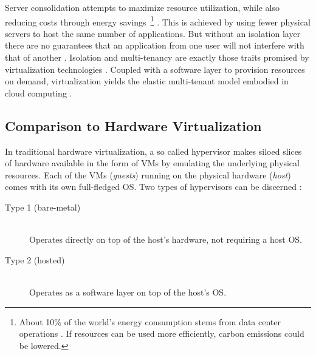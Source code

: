 Server consolidation attempts to maximize resource utilization, while also reducing costs through energy savings~\footnote{About 10\% of the world's energy consumption stems from data center operations \cite[p.~1]{scheepers2014virtualization}. If resources can be used more efficiently, carbon emissions could be lowered.} \cite[p.~233]{xavier2013performance} \cite[p.~2]{eder2016hypervisor}. This is achieved by using fewer physical servers to host the same number of applications. But without an isolation layer there are no guarantees that an application from one user will not interfere with that of another \cite[p.~233]{xavier2013performance}. Isolation and multi-tenancy are exactly those traits promised by virtualization technologies \cite[p.~21]{da2018containers}. Coupled with a software layer to provision resources on demand, virtualization yields the elastic multi-tenant model embodied in \gls{cloud computing} \cite[p.~203]{kang2016container} \cite[p.~81]{bernstein2014containers} \cite[p.~24]{pahl2015containerization}.


\subsection{Comparison to Hardware Virtualization}
\label{sec:os-hardware-virtualization-comparison}

In traditional hardware virtualization, a so called hypervisor makes siloed slices of hardware available in the form of \acp{VM} by emulating the underlying physical resources. Each of the \acp{VM} (\textit{guests}) running on the physical hardware (\textit{host}) comes with its own full-fledged \acs{OS}. Two types of hypervisors can be discerned \cite[p.~2]{merkel2014docker} \cite[p.~1]{eder2016hypervisor} \cite[pp.~386--387]{morabito2015hypervisors}:

\begin{description}
  \item[Type 1 (bare-metal)]
  \hfill \\
  Operates directly on top of the host's hardware, not requiring a host \acs{OS}.


  \item[Type 2 (hosted)]
  \hfill \\
  Operates as a software layer on top of the host's \acs{OS}.

\end{description}

